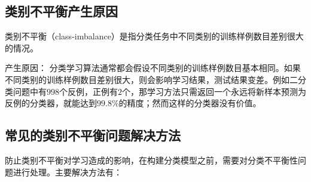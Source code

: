\subsection{类别不平衡产生原因}

类别不平衡（class-imbalance）是指分类任务中不同类别的训练样例数目差别很大的情况。


产生原因： 分类学习算法通常都会假设不同类别的训练样例数目基本相同。如果不同类别的训练样例数目差别很大，则会影响学习结果，测试结果变差。例如二分类问题中有$998$个反例，正例有$2$个，那学习方法只需返回一个永远将新样本预测为反例的分类器，就能达到$99.8\%$的精度；然而这样的分类器没有价值。

\subsection{常见的类别不平衡问题解决方法}

防止类别不平衡对学习造成的影响，在构建分类模型之前，需要对分类不平衡性问题进行处理。主要解决方法有：

